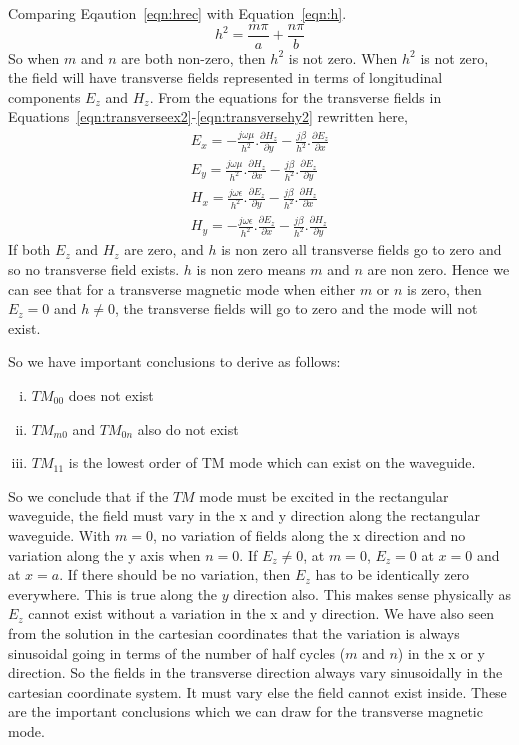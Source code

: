 Comparing Eqaution~\eqref{eqn:hrec} with Equation~\eqref{eqn:h}.
\begin{dmath*}
h^{2} =  \frac{m\pi}{a} + \frac{n\pi}{b}
\end{dmath*} 
So when $m$ and $n$ are both non-zero, then $h^2$ is not zero. When $h^2$ is not zero, the field will have transverse fields represented in terms of longitudinal components $E_z$ and $H_z$. From the equations for the transverse fields in Equations~\eqref{eqn:transverseex2}-\eqref{eqn:transversehy2} rewritten here,
\begin{align*}
E_x = -\frac{j\omega\mu}{h^2}.\frac{\partial H_z}{\partial y} - \frac{j\beta}{h^2}.\frac{\partial E_z}{\partial x}\\
E_y = \frac{j\omega\mu}{h^2}.\frac{\partial H_z}{\partial x} - \frac{j\beta}{h^2}.\frac{\partial E_z}{\partial y}\\
H_x = \frac{j\omega\epsilon}{h^2}.\frac{\partial E_z}{\partial y} - \frac{j\beta}{h^2}.\frac{\partial H_z}{\partial x}\\
H_y = -\frac{j\omega\epsilon}{h^2}.\frac{\partial E_z}{\partial x} - \frac{j\beta}{h^2}.\frac{\partial H_z}{\partial y}
\end{align*}
If both $E_z$ and $H_z$ are zero, and $h$ is non zero all transverse fields go to zero and so no transverse field exists. $h$ is non zero means $m$ and $n$ are non zero. Hence we can see that for a transverse magnetic mode when either $m$ or $n$ is zero, then $E_z=0$ and $h\neq 0$, the transverse fields will go to zero and the mode will not exist.

So we have important conclusions to derive as follows:
\begin{enumerate}[(i)]
\item $TM_{00}$ does not exist
\item $TM_{m0}$ and $TM_{0n}$ also do not exist
\item $TM_{11}$ is the lowest order of TM mode which can exist on the waveguide.
\end{enumerate}
So we conclude that if the $TM$ mode must be excited in the rectangular waveguide, the field must vary in the x and y direction along the rectangular waveguide. With $m=0$, no variation of fields along the x direction and no variation along the y axis when $n=0$. If $E_z \neq 0$, at $m=0$, $E_z=0$ at $x=0$ and at $x=a$. If there should be no variation, then $E_z$ has to be identically zero everywhere. This is true along the $y$ direction also. This makes sense physically as $E_z$ cannot exist without a variation in the x and y direction. We have also seen from the solution in the cartesian coordinates that the variation is always sinusoidal going in terms of the number of half cycles ($m$ and $n$) in the x or y direction. So the fields in the transverse direction always vary sinusoidally in the cartesian coordinate system. It must vary else the field cannot exist inside. These are the important conclusions which we can draw for the transverse magnetic mode.


